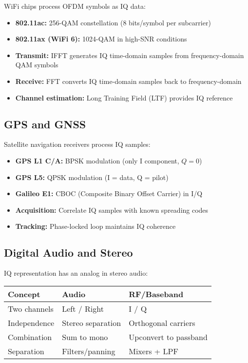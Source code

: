 WiFi chips process OFDM symbols as IQ data:

\begin{itemize}
\item \textbf{802.11ac:} 256-QAM constellation (8 bits/symbol per subcarrier)
\item \textbf{802.11ax (WiFi 6):} 1024-QAM in high-SNR conditions
\item \textbf{Transmit:} IFFT generates IQ time-domain samples from frequency-domain QAM symbols
\item \textbf{Receive:} FFT converts IQ time-domain samples back to frequency-domain
\item \textbf{Channel estimation:} Long Training Field (LTF) provides IQ reference
\end{itemize}

\subsection{GPS and GNSS}

Satellite navigation receivers process IQ samples:

\begin{itemize}
\item \textbf{GPS L1 C/A:} BPSK modulation (only I component, $Q = 0$)
\item \textbf{GPS L5:} QPSK modulation (I = data, Q = pilot)
\item \textbf{Galileo E1:} CBOC (Composite Binary Offset Carrier) in I/Q
\item \textbf{Acquisition:} Correlate IQ samples with known spreading codes
\item \textbf{Tracking:} Phase-locked loop maintains IQ coherence
\end{itemize}

\subsection{Digital Audio and Stereo}

IQ representation has an analog in stereo audio:

\begin{center}
\begin{tabular}{@{}lll@{}}
\toprule
Concept & Audio & RF/Baseband \\
\midrule
Two channels & Left / Right & I / Q \\
Independence & Stereo separation & Orthogonal carriers \\
Combination & Sum to mono & Upconvert to passband \\
Separation & Filters/panning & Mixers + LPF \\
\bottomrule
\end{tabular}
\end{center}

